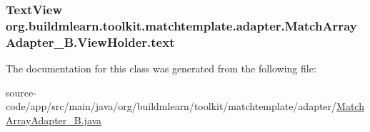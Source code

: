 \subsubsection[{\texorpdfstring{text}{text}}]{\setlength{\rightskip}{0pt plus 5cm}Text\+View org.\+buildmlearn.\+toolkit.\+matchtemplate.\+adapter.\+Match\+Array\+Adapter\+\_\+\+B.\+View\+Holder.\+text}\hypertarget{classorg_1_1buildmlearn_1_1toolkit_1_1matchtemplate_1_1adapter_1_1MatchArrayAdapter__B_1_1ViewHolder_a45f5c17f9447809c08d787ca5b722851}{}\label{classorg_1_1buildmlearn_1_1toolkit_1_1matchtemplate_1_1adapter_1_1MatchArrayAdapter__B_1_1ViewHolder_a45f5c17f9447809c08d787ca5b722851}


The documentation for this class was generated from the following file\+:\begin{DoxyCompactItemize}
\item 
source-\/code/app/src/main/java/org/buildmlearn/toolkit/matchtemplate/adapter/\hyperlink{MatchArrayAdapter__B_8java}{Match\+Array\+Adapter\+\_\+\+B.\+java}\end{DoxyCompactItemize}

